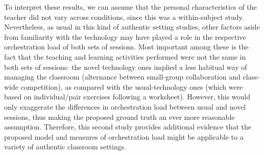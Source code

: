 \documentclass[10pt,journal,compsoc]{IEEEtran}
\begin{document}
To interpret these results, we can assume that the personal characteristics of the teacher did not vary across conditions, since this was a within-subject study. Nevertheless, as usual in this kind of authentic setting studies, other factors aside from familiarity with the technology may have played a role in the respective orchestration load of both sets of sessions. Most important among these is the fact that the teaching and learning activities performed were not the same in both sets of sessions: the novel technology ones implied a less habitual way of managing the classroom (alternance between small-group collaboration and class-wide competition), as compared with the usual-technology ones (which were based on individual/pair exercises following a worksheet). However, this would only exaggerate the differences in orchestration load between usual and novel sessions, thus making the proposed ground truth an ever more reasonable assumption. Therefore, this second study provides additional evidence that the proposed model and measures of orchestration load might be applicable to a variety of authentic classroom settings.

\end{document}
